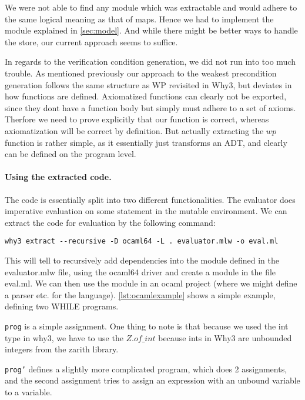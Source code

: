 We were not able to find any module which was extractable and would adhere to the same logical meaning as that of maps.
Hence we had to implement the module explained in \ref{sec:model}.
And while there might be better ways to handle the store, our current approach seems to suffice.

In regards to the verification condition generation, we did not run into too much trouble.
As mentioned previously our approach to the weakest precondition generation follows the same
structure as WP revisited in Why3\cite{wp-revisited},
but deviates in how functions are defined.
Axiomatized functions can clearly not be exported,
since they dont have a function body but simply must adhere to a set of axioms.
Therfore we need to prove explicitly that our function is correct,
whereas axiomatization will be correct by definition.
But actually extracting the $wp$ function is rather simple, as it essentially just transforms an ADT,
and clearly can be defined on the program level.


\paragraph{Using the extracted code.}
The code is essentially split into two different functionalities.
The evaluator does imperative evaluation on some statement in the mutable environment.
We can extract the code for evaluation by the following command:

\begin{lstlisting}
why3 extract --recursive -D ocaml64 -L . evaluator.mlw -o eval.ml
\end{lstlisting}

This will tell to recursively add dependencies into the module defined in the evaluator.mlw file, using the ocaml64 driver and create a module in the file eval.ml.
We can then use the module in an ocaml project (where we might define a parser etc. for the language).
\autoref{lst:ocamlexample} shows a simple example, defining two WHILE programs.

\texttt{prog} is a simple assignment. One thing to note is that because we used the int type in
why3, we have to use the \(Z.of\_int\) because ints in Why3 are unbounded integers from the zarith library.

\texttt{prog'} defines a slightly more complicated program, which does 2 assignments, and the second assignment tries to assign an expression with an unbound variable to a variable.

